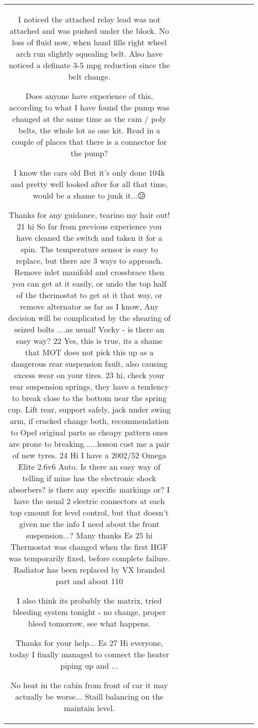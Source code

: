 \begin{table}[h!]
\begin{tabular}{|c|c|c|c|c|c|c|c|c|c|c|}
I noticed the attached relay lead was not attached and was pushed under the block. No loss of fluid now, when hand fills right wheel arch run slightly squealing belt. Also have noticed a definate 3-5 mpg reduction since the belt change.

Does anyone have experience of this, according to what I have found the pump was changed at the same time as the cam / poly belts, the whole lot as one kit. Read in a couple of places that there is a connector for the pump?

I know the cars old But it's only done 104k and pretty well looked after for all that time, would be a shame to junk it...😕

Thanks for any guidance, tearino my hair out!
21
hi
So far from previous experience you have cleaned the switch and taken it for a spin. The temperature sensor is easy to replace, but there are 3 ways to approach. Remove inlet manifold and crossbrace then you can get at it easily, or undo the top half of the thermostat to get at it that way, or remove alternator as far as I know, Any decision will be complicated by the shearing of seized bolts ....as usual!
Vocky - is there an easy way?
22
Yes, this is true, its a shame that MOT does not pick this up as a dangerous rear suspension fault, also causing excess wear on your tires.
23
hi,
check your rear suspension springs, they have a tendency to break close to the bottom near the spring cup. Lift rear, support safely, jack under swing arm, if cracked change both, recommendation to Opel original parts as cheapy pattern ones are prone to breaking......lesson cost me a pair of new tyres. 
24
Hi
I have a 2002/52 Omega Elite 2.6v6 Auto. Is there an easy way of telling if mine has the electronic shock absorbers? is there any specific markings or? I have the usual 2 electric connectors at each top cmount for level control, but that doesn't given me the info I need about the front suspension...?
Many thanks
Es
25
hi
Thermostat was changed when the first HGF was temporarily fixed, before complete failure. Radiator has been replaced by VX branded part and about 110%

I also think its probably the matrix, tried bleeding system tonight - no change, proper bleed tomorrow, see what happens.

Thanks for your help...
Es
27
Hi everyone, today I finally managed to connect the heater piping up and ...

No heat in the cabin from front of car it may actually be worse... Staill balancing on the maintain level.


\end{tabular}
\end{table}
